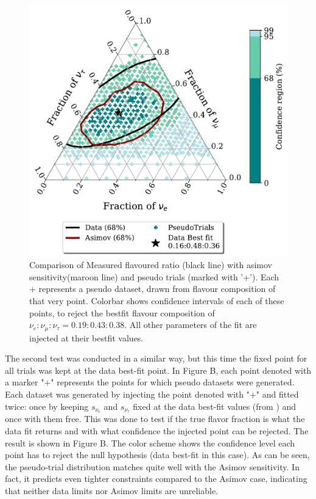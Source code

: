 \begin{figure}[h]
    
    \includegraphics{./figures/results/PE_data_asimov_68.pdf}


    \caption{Comparison of Measured flavoured ratio (black line) with asimov sensitivity(maroon line) and pseudo trials (marked with '+'). Each + represents a pseudo dataset, drawn from flavour composition of that very point. Colorbar shows confidence intervals of each of these points, to reject the bestfit flavour composition of $\nu_e:\nu_{\mu}:\nu_{\tau} = 0.19:0.43:0.38$. All other parameters of the fit are injected at their bestfit values.}
\end{figure}

The second test was conducted in a similar way, but this time the fixed point for all trials was kept at the data best-fit point. In Figure B, each point denoted with a marker "+" represents the points for which pseudo datasets were generated. Each dataset was generated by injecting the point denoted with "+" and fitted twice: once by keeping $s_{\nu_{e}}$ and $s_{\nu_{\tau}}$ fixed at the data best-fit values (from ) and once with them free. This was done to test if the true flavor fraction is what the data fit returns and with what confidence the injected point can be rejected. The result is shown in Figure B. The color scheme shows the confidence level each point has to reject the null hypothesis (data best-fit in this case). As can be seen, the pseudo-trial distribution matches quite well with the Asimov sensitivity. In fact, it predicts even tighter constraints compared to the Asimov case, indicating that neither data limits nor Asimov limits are unreliable.

